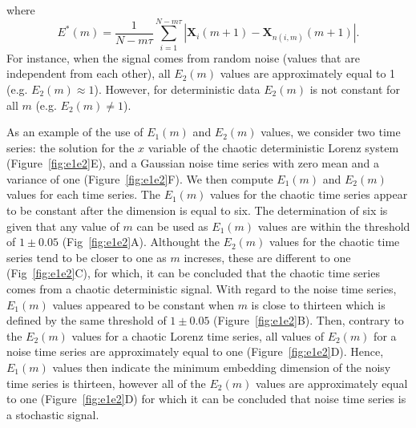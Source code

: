 where
\begin{equation}\label{eq:ee}
E^*(m) = \frac{1}{N-m\tau} \sum_{i=1}^{N-m\tau}
|  \boldsymbol{X}_i(m+1) - \boldsymbol{X}_{n(i,m)}(m+1) |.
\end{equation}
For instance, when the signal comes from random noise (values that are 
independent from each other), all $E_2(m)$ values are approximately equal 
to 1 (e.g. $E_2(m) \approx 1$). However, for deterministic data $E_2(m)$ is 
not constant for all $m$ (e.g. $E_2(m) \neq 1$).

As an example of the use of $E_1(m)$ and $E_2(m)$ values, we consider two time 
series: the solution for the $x$ variable  of the chaotic deterministic Lorenz 
system (Figure~\ref{fig:e1e2}E), and a Gaussian noise time series with 
zero mean and a variance of one (Figure~\ref{fig:e1e2}F).
We then compute $E_1(m)$ and $E_2(m)$ values for each time series.
The $E_1(m)$ values for the chaotic time series appear to be constant
after the dimension is equal to six. The determination of six is 
given that any value of $m$ can be used as $E_1(m)$ values are within 
the threshold of $1\pm0.05$ (Fig~\ref{fig:e1e2}A). 
Althought the $E_2(m)$ values for the chaotic time series tend to be closer to
one as $m$ increses, these are different to one (Fig~\ref{fig:e1e2}C), 
for which, it can be concluded that the chaotic time series comes 
from a chaotic deterministic signal.
With regard to the noise time series,  $E_1(m)$ values appeared to be constant
when $m$ is close to thirteen which is defined by the same threshold of 
$1\pm0.05$ (Figure~\ref{fig:e1e2}B). 
Then, contrary to the $E_2(m)$ values for a chaotic 
Lorenz time series, all values of $E_2(m)$ for a noise time series are 
approximately equal to one (Figure~\ref{fig:e1e2}D). 
Hence, $E_1(m)$ values then indicate the minimum 
embedding dimension of the noisy time series is thirteen, however all of 
the $E_2(m)$ values are approximately equal to one (Figure~\ref{fig:e1e2}D)
for which it can be concluded that noise time series is a stochastic signal.
